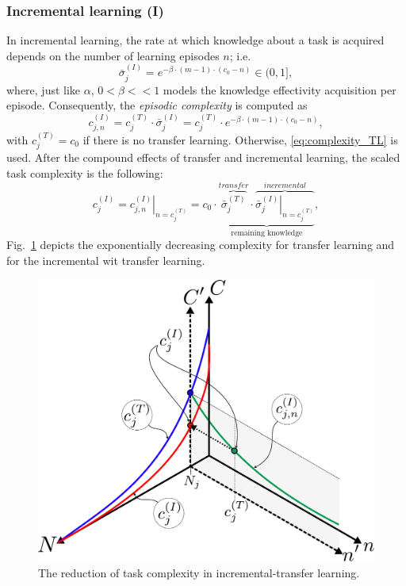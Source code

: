 \subsubsection{Incremental learning (I)}
In incremental learning, the rate at which knowledge about a task is acquired depends on the number of learning episodes $n$; i.e. 
\begin{equation}
  \bar{\sigma}^{(I)}_j = e^{-\beta \cdot (m-1) \cdot (c_0 - n)}  \in (0,1],
\end{equation}
where, just like $\alpha$, $0<\beta<<1$ models the knowledge effectivity acquisition per episode. Consequently, the \emph{episodic complexity} is computed as
\begin{equation}
  c^{(I)}_{j,n} = c^{(T)}_j \cdot {\bar{\sigma}^{(I)}_j} = c^{(T)}_j \cdot e^{-\beta \cdot (m-1) \cdot (c_0 - n)},
\end{equation}
with $c^{(T)}_j = c_0$ if there is no transfer learning. Otherwise, \eqref{eq:complexity_TL} is used. After the compound effects of transfer and incremental learning, the scaled task complexity is the following:
\begin{equation}\label{eq:complexity_TIL}
c^{(I)}_j = \left. c^{(I)}_{j,n}\right\vert_{n = c^{(T)}_j}
          = c_0 \cdot \underbrace{\overbrace{\bar{\sigma}^{(T)}_j}^{transfer} \cdot \overbrace{\left.{\bar{\sigma}^{(I)}_j}\right\vert_{n = c^{(T)}_j}}^{incremental}}_{\text{remaining knowledge}},
\end{equation}
Fig.~\ref{fig:complexity_TIL} depicts the exponentially decreasing complexity for transfer learning and for the incremental wit transfer learning.
\begin{figure}[!t]
	\centering
	\includegraphics[width=0.99\columnwidth]{fig/concept_TIL.pdf}
	\caption{The reduction of task complexity in incremental-transfer learning.}
	\label{fig:complexity_TIL}
\end{figure}

